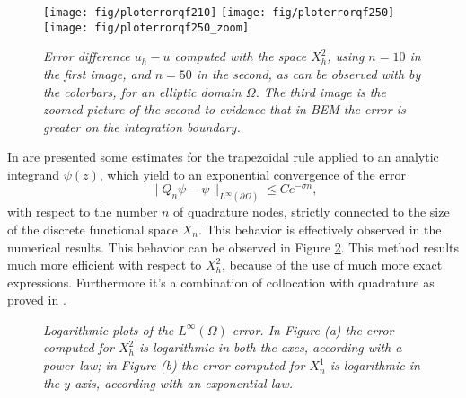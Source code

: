 \documentclass[10pt, a4paper]{article} %
\numberwithin{equation}{section}
\theoremstyle{definition}
\theoremstyle{plain}
\theoremstyle{plain}
\theoremstyle{plain}
\theoremstyle{plain}
\theoremstyle{plain}
\theoremstyle{plain}
\theoremstyle{plain}
\theoremstyle{plain}
\begin{document}
\begin{center}
\begin{figure}
{
\texttt{[image: fig/ploterrorqf210]}
}
{
\texttt{[image: fig/ploterrorqf250]}
}
{
\texttt{[image: fig/ploterrorqf250\_zoom]}
}
\caption{\emph{Error difference $u_h - u$ computed with the space $X^2_h$, 
using $n=10$ in the first image, and $n=50$ in the second, as can be observed with by the colorbars, 
for an elliptic domain $\Omega$. The third image is the zoomed picture of the second to 
evidence that in BEM the error is greater on the integration boundary.}}
\label{fig:ploterrorqf2}
\end{figure}
\end{center}
In \cite{kress:book} are presented some estimates for the trapezoidal rule
applied to an analytic integrand $\psi(z)$, which yield to an exponential convergence of the error
\begin{equation}
 \|Q_n\psi - \psi\|_{L^\infty(\partial\Omega)} \leq Ce^{-\sigma n},
\end{equation}
with respect to the number $n$ of quadrature nodes, strictly connected to the size of the discrete
functional space $X_n$. This behavior is effectively observed in the numerical results.
This behavior can be observed in Figure \ref{fig:errorinfinty}. This method results much more
efficient with respect to $X^2_h$, because of the use of much more exact expressions. Furthermore
it's a combination of collocation with quadrature as proved in \cite{kress:book}.
\begin{center}
\begin{figure}
\caption{\emph{Logarithmic plots of the $L^\infty(\Omega)$ error. In Figure (a) the error 
computed for $X^2_h$ is logarithmic in both the axes, according with a power law;
in Figure (b) the error 
computed for $X^1_n$ is logarithmic in the $y$ axis, according with an exponential law.}}
\label{fig:errorinfinty}
\end{figure}
\end{center}
\end{document}

